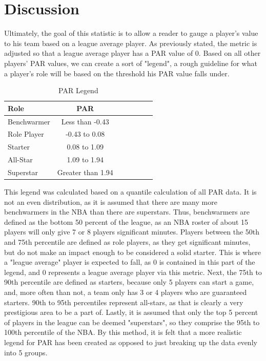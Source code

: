 \documentclass[12pt]{article}
\begin{document}
\section{Discussion}
Ultimately, the goal of this statistic is to allow a reader to gauge a player's value to his team based on a 
league average player. As previously stated, the metric is adjusted so that a league average player has a 
PAR value of 0. Based on all other players' PAR values, we can create a sort of "legend", a rough guideline 
for what a player's role will be based on the threshold his PAR value falls under.

\begin{table}[H]
  \caption{PAR Legend}
  \label{tab:PARLegend}
\centering
\begin{tabular}[t]{lccllll}
  \toprule
  Role &  PAR\\
  \midrule
Benchwarmer & Less than -0.43\\
  \midrule
Role Player & -0.43 to 0.08\\
  \midrule
Starter & 0.08 to 1.09\\
  \midrule
All-Star & 1.09 to 1.94\\
 \midrule
Superstar & Greater than 1.94\\
  \bottomrule
\end{tabular}
\end{table}

This legend was calculated based on a quantile calculation of all PAR data. It is not an even distribution, as 
it is assumed that there are many more benchwarmers in the NBA than there are superstars. Thus, 
benchwarmers are defined as the bottom 50 percent of the league, as an NBA roster of about 15 players 
will only give 7 or 8 players significant minutes. Players between the 50th and 75th percentile are defined 
as role players, as they get significant minutes, but do not make an impact enough to be considered a solid 
starter. This is where  a "league average" player is expected to fall, as 0 is contained in this part of the 
legend, and 0 represents a league average player via this metric. Next, the 75th to 90th percentile are 
defined as starters, because only 5 players can start a game, and, more often than not, a team only has 3 
or 4 players who are guaranteed starters. 90th to 95th percentiles represent all-stars, as that is clearly a 
very prestigious area to be a part of. Lastly, it is assumed that only the top 5 percent of players in the 
league can be deemed "superstars", so they comprise the 95th to 100th percentile of the NBA. By this 
method, it is felt that a more realistic legend for PAR has been created as opposed to just breaking up the 
data evenly into 5 groups.
\end{document}
